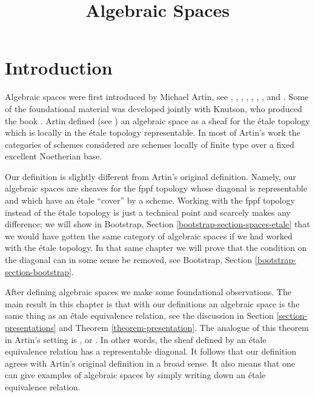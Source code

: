 

%


\title{Algebraic Spaces}


\maketitle

\label{section-phantom}

\tableofcontents

\section{Introduction}
\label{section-introduction}

\noindent
Algebraic spaces were first introduced by Michael Artin,
see \cite{ArtinI}, \cite{ArtinII},
\cite{Artin-Theorem-Representability},
\cite{Artin-Construction-Techniques},
\cite{Artin-Algebraic-Spaces},
\cite{Artin-Algebraic-Approximation},
\cite{Artin-Implicit-Function},
and \cite{ArtinVersal}.
Some of the foundational material was developed jointly with
Knutson, who produced the book \cite{Kn}.
Artin defined (see \cite[Definition 1.3]{Artin-Implicit-Function})
an algebraic space as a sheaf for the \'etale topology
which is locally in the \'etale topology representable.
In most of Artin's work the categories of schemes
considered are schemes locally of finite type over a fixed
excellent Noetherian base.

\medskip\noindent
Our definition is slightly different from Artin's original definition.
Namely, our algebraic spaces are sheaves for the fppf topology
whose diagonal is representable and which have an \'etale ``cover''
by a scheme. Working with the fppf topology instead of the \'etale
topology is just a technical point and scarcely makes
any difference; we will show in
Bootstrap, Section \ref{bootstrap-section-spaces-etale}
that we would have gotten the same category of algebraic spaces
if we had worked with the \'etale topology. In that same chapter
we will prove that the condition on the diagonal
can in some sense be removed, see
Bootstrap, Section \ref{bootstrap-section-bootstrap}.

\medskip\noindent
After defining algebraic spaces we make some foundational observations.
The main result in this chapter is that with our definitions
an algebraic space is the same thing as an \'etale equivalence relation,
see the discussion in Section \ref{section-presentations} and
Theorem \ref{theorem-presentation}. The analogue of this theorem in
Artin's setting is \cite[Theorem 1.5]{Artin-Implicit-Function}, or
\cite[Proposition II.1.7]{Kn}. In other words, the sheaf
defined by an \'etale equivalence relation has a representable diagonal.
It follows that our definition agrees with Artin's original definition
in a broad sense. It also means that one can give examples of algebraic
spaces by simply writing down an \'etale equivalence relation.

